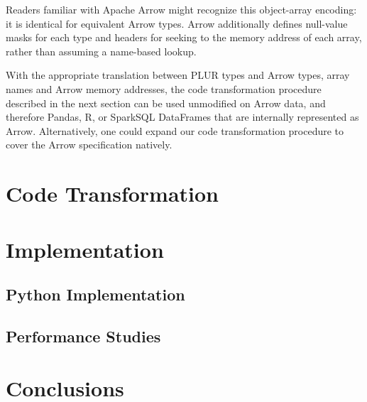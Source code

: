 \documentclass[10pt, conference, compsocconf]{IEEEtran}
\begin{document}
Readers familiar with Apache Arrow might recognize this object-array encoding\cite{arrow-layout}: it is identical for equivalent Arrow types. Arrow additionally defines null-value masks for each type and headers for seeking to the memory address of each array, rather than assuming a name-based lookup.

With the appropriate translation between PLUR types and Arrow types, array names and Arrow memory addresses, the code transformation procedure described in the next section can be used unmodified on Arrow data, and therefore Pandas\cite{pandas}, R\cite{R}, or SparkSQL\cite{sparksql} DataFrames that are internally represented as Arrow. Alternatively, one could expand our code transformation procedure to cover the Arrow specification natively.

\section{Code Transformation}

\section{Implementation}

\subsection{Python Implementation}

\subsection{Performance Studies}

\section{Conclusions}



\end{document}
